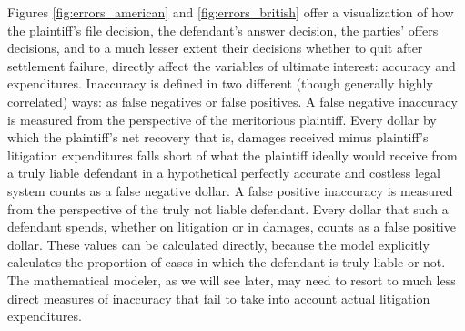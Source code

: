 \documentclass{article}
\begin{document}
Figures \ref{fig:errors_american} and \ref{fig:errors_british} offer a visualization of how the plaintiff's file decision, the defendant's answer decision, the parties' offers decisions, and to a much lesser extent their decisions whether to quit after settlement failure, directly affect the variables of ultimate interest: accuracy and expenditures. Inaccuracy is defined in two different (though generally highly correlated) ways: as false negatives or false positives. A false negative inaccuracy is measured from the perspective of the meritorious plaintiff. Every dollar by which the plaintiff's net recovery \textemdash that is, damages received minus plaintiff's litigation expenditures \textemdash falls short of what the plaintiff ideally would receive from a truly liable defendant in a hypothetical perfectly accurate and costless legal system counts as a false negative dollar. A false positive inaccuracy is measured from the perspective of the truly not liable defendant. Every dollar that such a defendant spends, whether on litigation or in damages, counts as a false positive dollar. These values can be calculated directly, because the model explicitly calculates the proportion of cases in which the defendant is truly liable or not. The mathematical modeler, as we will see later, may need to resort to much less direct measures of inaccuracy that fail to take into account actual litigation expenditures.
\end{document}
